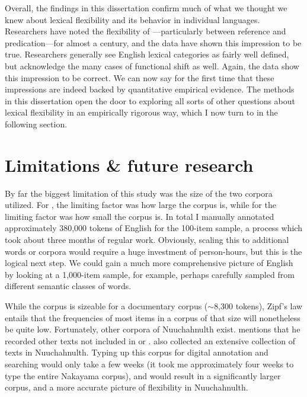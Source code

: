 Overall, the findings in this dissertation confirm much of what we thought we knew about lexical flexibility and its behavior in individual languages. Researchers have noted the flexibility of —particularly between reference and predication—for almost a century, and the data have shown this impression to be true. Researchers generally see English lexical categories as fairly well defined, but acknowledge the many cases of functional shift as well. Again, the data show this impression to be correct. We can now say for the first time that these impressions are indeed backed by quantitative empirical evidence. The methods in this dissertation open the door to exploring all sorts of other questions about lexical flexibility in an empirically rigorous way, which I now turn to in the following section.

\section{Limitations \& future research}
\label{sec:5.4}

By far the biggest limitation of this study was the size of the two corpora utilized. For , the limiting factor was how large the corpus is, while for  the limiting factor was how small the corpus is. In total I manually annotated approximately 380,000 tokens of English for the 100-item sample, a process which took about three months of regular work. Obviously, scaling this to additional words or corpora would require a huge investment of person-hours, but this is the logical next step. We could gain a much more comprehensive picture of English by looking at a 1,000-item sample, for example, perhaps carefully sampled from different semantic classes of words.

While the  corpus is sizeable for a documentary corpus ($\sim$8,300 tokens), Zipf's law entails that the frequencies of most items in a corpus of that size will nonetheless be quite low. Fortunately, other corpora of Nuuchahnulth exist. \textcite{Nakayama2001} mentions that he recorded other texts not included in \textcite{Little2003} or \textcite{Louie2003}. \textcite{SapirSwadesh1939} also collected an extensive collection of texts in Nuuchahnulth. Typing up this corpus for digital annotation and searching would only take a few weeks (it took me approximately four weeks to type the entire Nakayama corpus), and would result in a significantly larger corpus, and a more accurate picture of flexibility in Nuuchahnulth.

